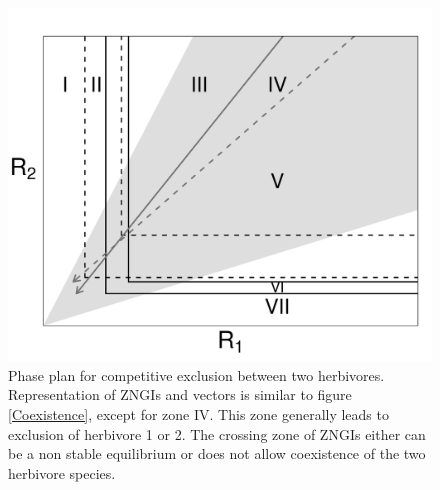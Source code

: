 \documentclass[12pt]{article}
\begin{document}
\begin{figure}[h]
\includegraphics[width=16 cm, keepaspectratio]{Exclusion2Herbivores}
\caption{Phase plan for competitive exclusion between two herbivores. Representation of ZNGIs and vectors is similar to figure \ref{Coexistence}, except for zone IV. This zone generally leads to exclusion of herbivore 1 or 2. The crossing zone of ZNGIs either can be a non stable equilibrium  or does not allow coexistence of the two herbivore species. }
\label{Exclusion}
\end{figure}
\end{document}

